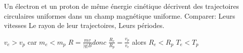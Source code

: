 \begin{Exercise}[title=Action d'un champ magnétique sur une proton et un électron]
		Un électron et un proton de même énergie cinétique décrivent des
        trajectoires circulaires uniformes dans un champ magnétique uniforme.
        Comparer:
			\Question Leurs vitesses
			\Question Le rayon de leur trajectoires,
			\Question Leurs périodes.
\end{Exercise}
\begin{Answer}
		\Question $v_e > v_p$ car $m_e<m_p$
		\Question $R= \frac{mv}{|q|B}  donc$ $\frac{R_e}{R_p} = \frac{v_p}{v_e}$ alors $R_e< R_p$
		\Question $T_e< T_p$
\end{Answer}
